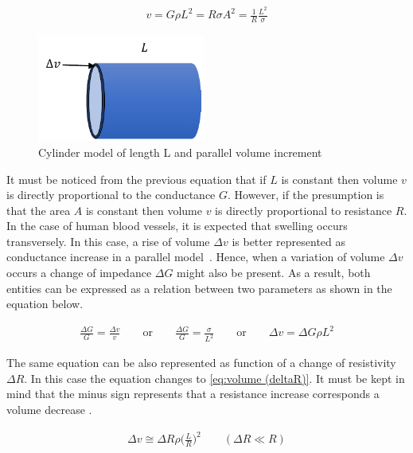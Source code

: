 \begin{align}
\label{eq:volume (R)}
v=G \rho L^2 = R\sigma A^2 = \frac{1}{R} \frac{L^2}{\sigma}
\end{align}

\begin{figure}[!htpb]
	\centering
	\includegraphics[width=5.5cm,keepaspectratio]{figure4}    
	\caption[Cylinder model for impedance calculation]{Cylinder model of length L and parallel volume increment}
	\label{fig:cylinder model}
\end{figure}
 

It must be noticed from the previous equation that if $L$ is constant then volume $v$ is directly proportional to the conductance $G$. However, if the presumption is that the area $A$ is constant then volume $v$ is directly proportional to resistance $R$. In the case of human blood vessels, it is expected that swelling occurs transversely. In this case, a rise of volume $\Delta v$  is better represented as conductance increase in a parallel model~\cite{martinsen2011bioimpedance}. Hence, when a variation of volume $\Delta v$ occurs a change of impedance $\Delta G$ might also be present. As a result, both entities can be expressed as a relation between two parameters as shown in the equation below.


\begin{align}
	\label{eq:volume (deltav)}
	\frac{\Delta G}{G} = \frac{\Delta v}{v} \qquad\text{or}\qquad \frac{\Delta G}{G} = \frac{\sigma}{L^2} \qquad\text{or}\qquad \Delta v = \Delta G \rho L^2
\end{align}


The same equation can be also represented as function of a change of resistivity $\Delta R$. In this case the equation changes to \ref{eq:volume (deltaR)}. It must be kept in mind that the minus sign represents that a resistance increase corresponds a volume decrease \cite{martinsen2011bioimpedance}. 
 
\begin{align}
	\label{eq:volume (deltaR)}
	 \Delta v \cong \Delta R \rho \bigg( \frac{L}{R} \bigg)^2 \qquad (\Delta R \ll R)
\end{align}

